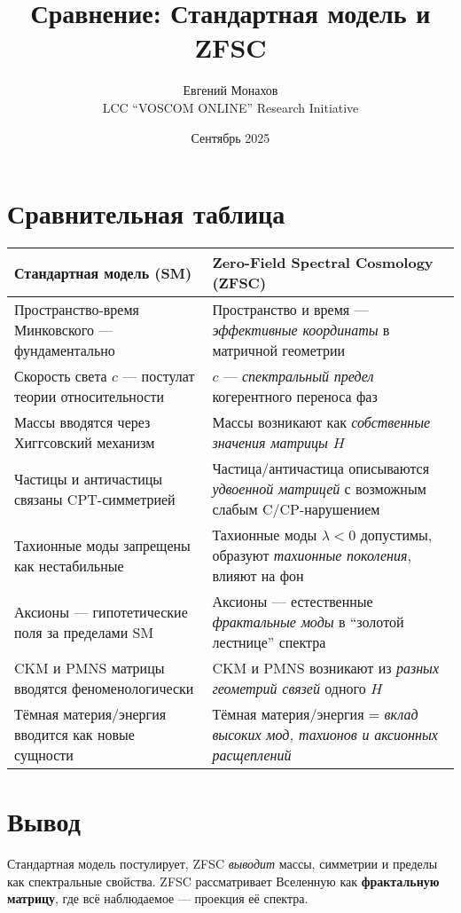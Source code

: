\documentclass[12pt,a4paper]{article}
\title{Сравнение: Стандартная модель и ZFSC}
\author{Евгений Монахов \\ LCC ``VOSCOM ONLINE'' Research Initiative}
\date{Сентябрь 2025}
\begin{document}
\maketitle

\section*{Сравнительная таблица}

\begin{tabular}{p{6cm}p{6cm}}
\toprule
\textbf{Стандартная модель (SM)} & \textbf{Zero-Field Spectral Cosmology (ZFSC)} \\
\midrule
Пространство-время Минковского --- фундаментально & Пространство и время --- \emph{эффективные координаты} в матричной геометрии \\
\midrule
Скорость света $c$ --- постулат теории относительности & $c$ --- \emph{спектральный предел} когерентного переноса фаз \\
\midrule
Массы вводятся через Хиггсовский механизм & Массы возникают как \emph{собственные значения матрицы $H$} \\
\midrule
Частицы и античастицы связаны CPT-симметрией & Частица/античастица описываются \emph{удвоенной матрицей} с возможным слабым C/CP-нарушением \\
\midrule
Тахионные моды запрещены как нестабильные & Тахионные моды $\lambda<0$ допустимы, образуют \emph{тахионные поколения}, влияют на фон \\
\midrule
Аксионы --- гипотетические поля за пределами SM & Аксионы --- естественные \emph{фрактальные моды} в ``золотой лестнице'' спектра \\
\midrule
CKM и PMNS матрицы вводятся феноменологически & CKM и PMNS возникают из \emph{разных геометрий связей} одного $H$ \\
\midrule
Тёмная материя/энергия вводится как новые сущности & Тёмная материя/энергия = \emph{вклад высоких мод, тахионов и аксионных расщеплений} \\
\bottomrule
\end{tabular}

\section*{Вывод}
Стандартная модель постулирует, ZFSC \emph{выводит} массы, симметрии и пределы как спектральные свойства.  
ZFSC рассматривает Вселенную как \textbf{фрактальную матрицу}, где всё наблюдаемое --- проекция её спектра.
\end{document}
